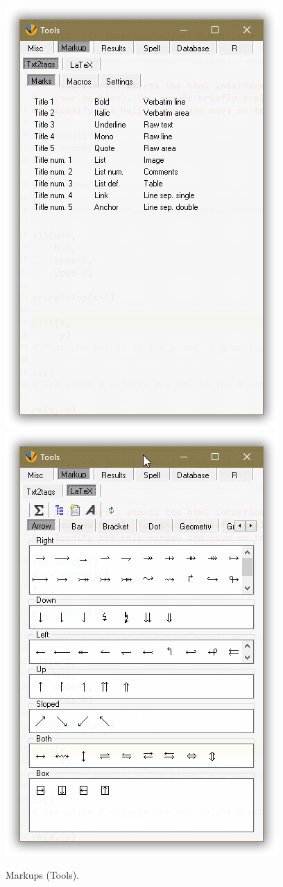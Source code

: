 \begin{figure}[H]
  \includegraphics[scale=0.35]{./res/tools_markup_txt2tags_marks.png}~~
  \includegraphics[scale=0.35]{./res/tools_markup_latex_arrows.png}\\
  \caption{Markups (Tools).}
  \label{fig:tools_markup_txt2tags_options}
\end{figure}

